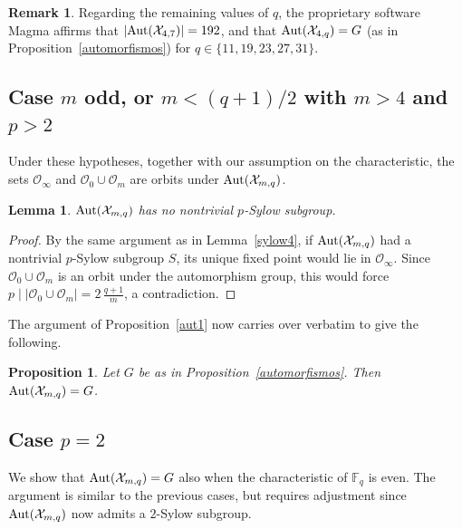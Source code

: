 \documentclass[12pt]{amsart}
\newtheorem{lemma}[theorem]{Lemma}
\newtheorem{proposition}[theorem]{Proposition}
\theoremstyle{remark}
\theoremstyle{definition}
\newtheorem{remark}[theorem]{Remark}
\def\Aut{{\rm Aut}}
\begin{document}
\begin{remark}
Regarding the remaining values of $q$, 
the proprietary software Magma affirms
that $|\Aut(\mathcal{X}_{4,7})| = 192$, and that 
$\Aut(\mathcal{X}_{4,q}) = G$ (as in Proposition~\ref{automorfismos}) for 
$q \in \{11, 19, 23, 27, 31\}$.
\end{remark}

	\subsection{\texorpdfstring
    {Case $m$ odd, or $m < (q+1)/2$ with $m > 4$ and $p > 2$}
    {Case m odd, or m < (q+1)/2, m > 4, p > 2}}

Under these hypotheses, together with our assumption on the characteristic, 
the sets $\mathcal{O}_\infty$ and $\mathcal{O}_0 \cup \mathcal{O}_m$ are 
orbits under $\Aut(\mathcal{X}_{m,q})$.

\begin{lemma}
    $\Aut(\mathcal{X}_{m,q})$ has no nontrivial $p$-Sylow subgroup.
\end{lemma}

\begin{proof}
    By the same argument as in Lemma~\ref{sylow4}, if $\Aut(\mathcal{X}_{m,q})$ 
    had a nontrivial $p$-Sylow subgroup $S$, its unique fixed point would lie in 
    $\mathcal{O}_\infty$. Since $\mathcal{O}_0 \cup \mathcal{O}_m$ is an 
    orbit under the automorphism group, this would force 
    $p \mid |\mathcal{O}_0 \cup \mathcal{O}_m| = 2\,\frac{q+1}{m}$, 
    a contradiction.
\end{proof}

The argument of Proposition~\ref{aut1} now carries over verbatim to give 
the following.

\begin{proposition}
    Let $G$ be as in Proposition~\ref{automorfismos}. Then 
    $\Aut(\mathcal{X}_{m,q}) = G$.
\end{proposition}


\subsection{\texorpdfstring{Case $p = 2$}{Case p = 2}}

We show that $\Aut(\mathcal{X}_{m,q}) = G$ also when the characteristic 
of $\mathbb{F}_q$ is even. The argument is similar to the previous cases, 
but requires adjustment since $\Aut(\mathcal{X}_{m,q})$ now admits a 
$2$-Sylow subgroup.
\end{document}
